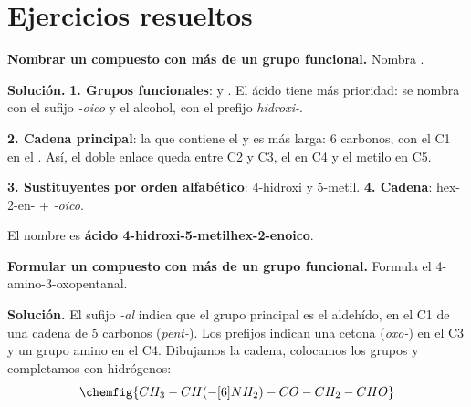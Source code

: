 
\sloppy %

\section{Ejercicios resueltos}\label{sec:ud7-resueltos}

\begin{example}
    \textbf{Nombrar un compuesto con más de un grupo funcional.} Nombra .

    \textbf{Solución.} \textbf{1. Grupos funcionales}:  y . El ácido tiene más prioridad: se nombra con el sufijo
    \emph{-oico} y el alcohol, con el prefijo \emph{hidroxi-}.

    \textbf{2. Cadena principal}: la que contiene el  y es más larga: 6 carbonos, con el C1 en el . Así, el
    doble enlace queda entre C2 y C3, el  en C4 y el metilo en C5.

    \textbf{3. Sustituyentes por orden alfabético}: 4-hidroxi y 5-metil. \textbf{4. Cadena}: hex-2-en- + \emph{-oico}.

    El nombre es \textbf{ácido 4-hidroxi-5-metilhex-2-enoico}.
\end{example}

\begin{example}
    \textbf{Formular un compuesto con más de un grupo funcional.} Formula el 4-amino-3-oxopentanal.

    \textbf{Solución.} El sufijo \emph{-al} indica que el grupo principal es el aldehído, en el C1 de una cadena de 5 carbonos
    (\emph{pent-}). Los prefijos indican una cetona (\emph{oxo-}) en el C3 y un grupo amino en el C4. Dibujamos la cadena, colocamos
    los grupos y completamos con hidrógenos:
    \[ \chemfig{CH_3-CH(-[6]NH_2)-CO-CH_2-CHO} \]
\end{example}


